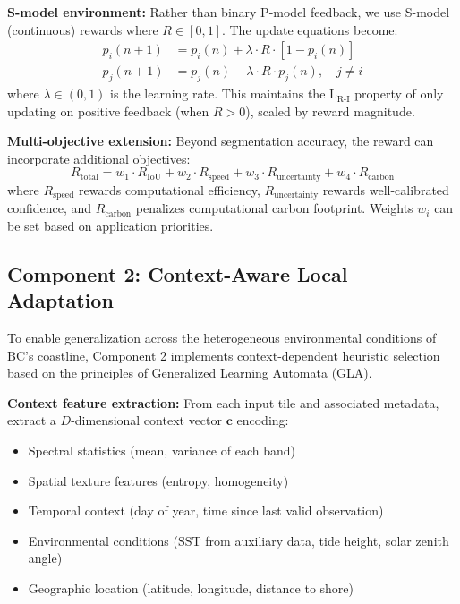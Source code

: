 \documentclass[12pt,oneside]{book}
\begin{document}
\textbf{S-model environment:} Rather than binary P-model feedback, we use S-model (continuous) rewards where $R \in [0, 1]$. The update equations become:
\begin{align}
    p_i(n+1) &= p_i(n) + \lambda \cdot R \cdot [1 - p_i(n)] \\
    p_j(n+1) &= p_j(n) - \lambda \cdot R \cdot p_j(n), \quad j \neq i
\end{align}
where $\lambda \in (0, 1)$ is the learning rate. This maintains the L$_\text{R-I}$ property of only updating on positive feedback (when $R > 0$), scaled by reward magnitude.

\textbf{Multi-objective extension:} Beyond segmentation accuracy, the reward can incorporate additional objectives:
\begin{equation}
    R_\text{total} = w_1 \cdot R_\text{IoU} + w_2 \cdot R_\text{speed} + w_3 \cdot R_\text{uncertainty} + w_4 \cdot R_\text{carbon}
\end{equation}
where $R_\text{speed}$ rewards computational efficiency, $R_\text{uncertainty}$ rewards well-calibrated confidence, and $R_\text{carbon}$ penalizes computational carbon footprint. Weights $w_i$ can be set based on application priorities.

\subsection{Component 2: Context-Aware Local Adaptation}
\label{subsec:component2}

To enable generalization across the heterogeneous environmental conditions of BC's coastline, Component 2 implements context-dependent heuristic selection based on the principles of Generalized Learning Automata (GLA).

\textbf{Context feature extraction:} From each input tile and associated metadata, extract a $D$-dimensional context vector $\mathbf{c}$ encoding:
\begin{itemize}
    \item Spectral statistics (mean, variance of each band)
    \item Spatial texture features (entropy, homogeneity)
    \item Temporal context (day of year, time since last valid observation)
    \item Environmental conditions (SST from auxiliary data, tide height, solar zenith angle)
    \item Geographic location (latitude, longitude, distance to shore)
\end{itemize}
\end{document}
